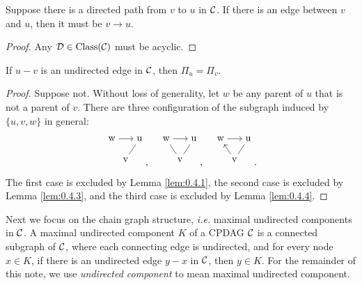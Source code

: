 \begin{lemma}\label{lem:0.4.4}
    Suppose there is a directed path from $v$ to $u$ in $\mathcal{C}$. If there is an edge between $v$ and $u$, then it must be $v \rightarrow u$.
\end{lemma}
\begin{proof}
    Any $\mathcal{D}\in\text{Class}(\mathcal{C})$ must be acyclic.
\end{proof}

\begin{corollary}\label{cor:0.4.1.1}
    If $u - v$ is an undirected edge in $\mathcal{C}$, then $\Pi_u = \Pi_v$.
\end{corollary}
\begin{proof}
    Suppose not. Without loss of generality, let $w$ be any parent of $u$ that is not a parent of $v$. 
    There are three configuration of the subgraph induced by $\{u,v,w\}$ in general: 
    \[\begin{tikzpicture}[scale=0.5]
        \node (w) at (0,0) {w};
        \node (u) at (2,0) {u};
        \node (v) at (1,-1.5) {v};
      
        \draw[->] (w) -- (u);
        \draw (u) -- (v);
      \end{tikzpicture},\quad
    \begin{tikzpicture}[scale=0.5]
        \node (w) at (0,0) {w};
        \node (u) at (2,0) {u};
        \node (v) at (1,-1.5) {v};
      
        \draw[->] (w) -- (u);
        \draw (w) -- (v);
        \draw (u) -- (v);
      \end{tikzpicture},\quad
      \begin{tikzpicture}[scale=0.5]
        \node (w) at (0,0) {w};
        \node (u) at (2,0) {u};
        \node (v) at (1,-1.5) {v};
      
        \draw[->] (w) -- (u);
        \draw[->] (v) -- (w);
        \draw (u) -- (v);
      \end{tikzpicture}.\]
      The first case is excluded by Lemma \ref*{lem:0.4.1}, the second case is excluded by Lemma \ref*{lem:0.4.3}, and the third case is excluded by Lemma \ref*{lem:0.4.4}.
\end{proof}

Next we focus on the chain graph structure, \emph{i.e.} maximal undirected components in $\mathcal{C}$.
A maximal undirected component $K$ of a CPDAG $\mathcal{C}$ is a connected subgraph of $\mathcal{C}$, where each connecting edge is undirected, and for every node $x \in K$, if there is an undirected edge $y-x$ in $\mathcal{C}$, then $y\in K$.
For the remainder of this note, we use \textit{undirected component} to mean maximal undirected component.

